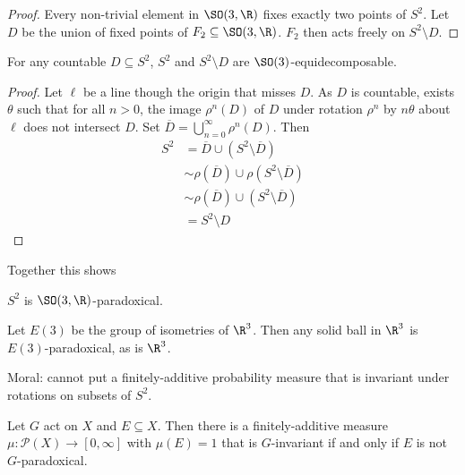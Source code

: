 \documentclass[a4paper]{article}
\begin{document}
\begin{proof}
  Every non-trivial element in \(\SO(3, \R)\) fixes exactly two points of \(S^2\). Let \(D\) be the union of fixed points of \(F_2 \subseteq \SO(3, \R)\). \(F_2\) then acts freely on \(S^2 \setminus D\).
\end{proof}

\begin{proposition}
  For any countable \(D \subseteq S^2\), \(S^2\) and \(S^2 \setminus D\) are \(\SO(3)\)-equidecomposable.
\end{proposition}

\begin{proof}
  Let \(\ell\) be a line though the origin that misses \(D\). As \(D\) is countable, exists \(\theta\) such that for all \(n > 0\), the image \(\rho^n(D)\) of \(D\) under rotation \(\rho^n\) by \(n \theta\) about \(\ell\) does not intersect \(D\). Set \(\overline D = \bigcup_{n = 0}^\infty \rho^n(D)\). Then
  \begin{align*}
    S^2
    &= \overline D \cup (S^2 \setminus \overline D) \\
    &\sim \rho(\overline D) \cup \rho(S^2 \setminus \overline D) \\
    &\sim \rho(\overline D) \cup (S^2 \setminus \overline D) \\
    &= S^2 \setminus D
  \end{align*}
\end{proof}

Together this shows

\begin{theorem}
  \(S^2\) is \(\SO(3, \R)\)-paradoxical.
\end{theorem}

\begin{theorem}
  Let \(E(3)\) be the group of isometries of \(\R^3\). Then any solid ball in \(\R^3\) is \(E(3)\)-paradoxical, as is \(\R^3\).
\end{theorem}

Moral: cannot put a finitely-additive probability measure that is invariant under rotations on subsets of \(S^2\).

\begin{theorem}[Tarski]
  Let \(G\) act on \(X\) and \(E \subseteq X\). Then there is a finitely-additive measure \(\mu: \mathcal P(X) \to [0, \infty]\) with \(\mu(E) = 1\) that is \(G\)-invariant if and only if \(E\) is not \(G\)-paradoxical.
\end{theorem}
\end{document}
